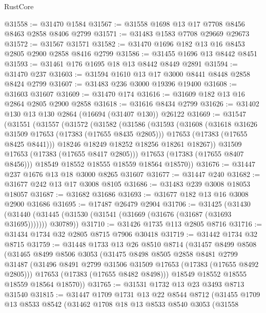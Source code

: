 \begin{lexlean}{RustCore}
\begin{coremodule}
@31558 := @31470 @1584
@31567 := @31558 @1698 @13 @17 @7708 @8456 @8463 @2858 @8406 @2799
@31571 := @31483 @1583 @7708 @29669 @29673
@31572 := @31567 @31571
@31582 := @31470 @1696 @182 @13 @16 @8453 @2805 @2900 @2858 @8416 @2799
@31586 := @31455 @1696 @13 @8442 @8451
@31593 := @31461 @176 @1695 @18 @13 @8442 @8449 @2891
@31594 := @31470 @237
@31603 := @31594 @1610 @13 @17 @3000 @8441 @8448 @2858 @8424 @2799
@31607 := @31483 @236 @3000 @19396 @19400
@31608 := @31603 @31607
@31609 := @31470 @174
@31616 := @31609 @182 @13 @16 @2864 @2805 @2900 @2858
@31618 := @31616 @8434 @2799
@31626 := @31402 @130 @13 @130 @2864 (@16694 (@31407 @130)) @26122
@31669 := @31547
    (@31551
      (@31557
        (@31572
          (@31582
            (@31586
              (@31593
                (@31608
                  (@31618 @31626 @31509 @17653 (@17383 (@17655 @8435 @2805)))
                  @17653
                  (@17383 (@17655 @8425 @8441)))
                @18246
                @18249
                @18252
                @18256
                @18261
                @18267))
            @31509
            @17653
            (@17383 (@17655 @8417 @2805)))
          @17653
          (@17383 (@17655 @8407 @8456)))
        @18549
        @18552
        @18555
        @18559
        @18564
        @18570))
@31676 := @31447 @237 @1676 @13 @18 @3000 @8265 @31607
@31677 := @31447 @240
@31682 := @31677 @242 @13 @17 @3008 @8105
@31686 := @31483 @239 @3008 @18053 @18057
@31687 := @31682 @31686
@31693 := @31677 @182 @13 @16 @3008 @2900 @31686
@31695 := @17487 @26479 @2904
@31706 := @31425
    (@31430 (@31440 (@31445 (@31530 (@31541 (@31669 (@31676 (@31687 (@31693 @31695))))))) @30789))
@31710 := @31426 @1735 @113 @2805 @8716
@31716 := @31434 @1734 @32 @2805 @8715 @7906 @30418
@31719 := @31442 @1734 @32 @8715
@31759 := @31448
    @1733
    @13
    @26
    @8510
    @8714
    (@31457
      @8499
      @8508
      (@31465
        @8499
        @8506
        @3053
        (@31475
          @8498
          @8505
          @2858
          @8481
          @2799
          @31487
          (@31496 @8491 @2799 @31506 @31509 @17653 (@17383 (@17655 @8492 @2805)))
          @17653
          (@17383 (@17655 @8482 @8498)))
        @18549
        @18552
        @18555
        @18559
        @18564
        @18570))
@31765 := @31531 @1732 @13 @23 @3493 @8713 @31540
@31815 := @31447
    @1709
    @1731
    @13
    @22
    @8544
    @8712
    (@31455
      @1709
      @13
      @8533
      @8542
      (@31462
        @1708
        @18
        @13
        @8533
        @8540
        @3053
        (@31558

\end{coremodule}
\end{lexlean}
